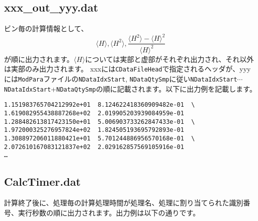 \subsection{xxx\_out\_yyy.dat}
ビン毎の計算情報として、
\begin{equation}
\langle H \rangle, \langle H^2 \rangle, \frac{\langle H^2 \rangle- \langle H \rangle^2 }{\langle H \rangle^2} \nonumber
\end{equation}
が順に出力されます。$\langle H \rangle$については実部と虚部がそれぞれ出力され、それ以外は実部のみ出力されます。
xxxには\verb|CDataFileHead|で指定されるヘッダが、yyyには\verb|ModPara|ファイルの\verb|NDataIdxStart|, \verb|NDataQtySmp|に従い\verb|NDataIdxStart|$\cdots$\verb|NDataIdxStart|+\verb|NDataQtySmp|の順に記載されます。以下に出力例を記載します。

\begin{minipage}{13cm}
\begin{screen}
\begin{verbatim}
1.151983765704212992e+01  8.124622418360909482e-01  \
1.619082955438887268e+02  2.019905203939084959e-01 
1.288482613817423150e+01  5.006903733262847433e-01  \ 
1.972000325276957824e+02  1.824505193695792893e-01
1.308897206011880421e+01  5.701244886956570168e-01  \
2.072610167083121837e+02  2.029162857569105916e-01
…
\end{verbatim}
\end{screen}
\end{minipage}

\subsection{CalcTimer.dat }
計算終了後に、処理毎の計算処理時間が処理名、処理に割り当てられた識別番号、実行秒数の順に出力されます。出力例は以下の通りです。

